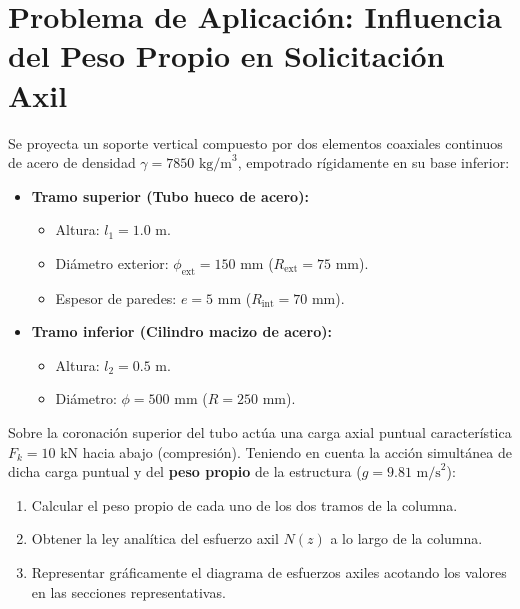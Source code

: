 \section{Problema de Aplicación: Influencia del Peso Propio en Solicitación Axil}

\begin{tcolorbox}[colback=blue!5!white,colframe=blue!75!black,title=\textbf{Problema 9: Columna Compuesta Escalonada con Carga Puntual y Peso Propio}]
    Se proyecta un soporte vertical compuesto por dos elementos coaxiales continuos de acero de densidad $\gamma = 7850\text{ kg/m}^3$, empotrado rígidamente en su base inferior:
    \begin{itemize}
        \item \textbf{Tramo superior (Tubo hueco de acero):}
              \begin{itemize}
                  \item Altura: $l_1 = 1.0\text{ m}$.
                  \item Diámetro exterior: $\phi_{\text{ext}} = 150\text{ mm}$ ($R_{\text{ext}} = 75\text{ mm}$).
                  \item Espesor de paredes: $e = 5\text{ mm}$ ($R_{\text{int}} = 70\text{ mm}$).
              \end{itemize}
        \item \textbf{Tramo inferior (Cilindro macizo de acero):}
              \begin{itemize}
                  \item Altura: $l_2 = 0.5\text{ m}$.
                  \item Diámetro: $\phi = 500\text{ mm}$ ($R = 250\text{ mm}$).
              \end{itemize}
    \end{itemize}

    Sobre la coronación superior del tubo actúa una carga axial puntual característica $F_k = 10\text{ kN}$ hacia abajo (compresión). Teniendo en cuenta la acción simultánea de dicha carga puntual y del \textbf{peso propio} de la estructura ($g = 9.81\text{ m/s}^2$):
    \begin{enumerate}[label=\textbf{\Alph*)}]
        \item Calcular el peso propio de cada uno de los dos tramos de la columna.
        \item Obtener la ley analítica del esfuerzo axil $N(z)$ a lo largo de la columna.
        \item Representar gráficamente el diagrama de esfuerzos axiles acotando los valores en las secciones representativas.
    \end{enumerate}
\end{tcolorbox}

